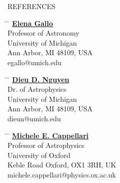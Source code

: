 \documentclass{resume} %
\begin{document}
\begin{rSection}{REFERENCES}
\noindent\parbox{0.1\textwidth}{ %
\begin{tabbing}
\hspace{0.2cm} \= \hspace{0.2cm} \= \kill %
\href{https://lsa.umich.edu/astro/people/core-faculty/egallo.html}{\textbf{Elena Gallo}}\\
Professor of Astronomy\\
University of Michigan\\
Ann Arbor, MI 48109, USA\\
egallo@umich.edu
\end{tabbing}}
\hfill %
\parbox{0.1\textwidth}{ %
\begin{tabbing}
\hspace{0.2cm} \= \hspace{0.2cm} \= \kill %
\href{https://scholar.google.com/citations?user=Koy8FSEAAAAJ&hl=vi&oi=ao}{\textbf{Dieu D. Nguyen}}\\
Dr. of Astrophysics\\
University of Michigan\\
Ann Arbor, MI 48109, USA\\ 
dieun@umich.edu
\end{tabbing}}
\hfill %
\parbox{0.1\textwidth}{ %
\begin{tabbing}
\hspace{0.2cm} \= \hspace{0.2cm} \= \kill %
\href{https://users.physics.ox.ac.uk/~cappellari/}{\textbf{Michele E. Cappellari}}\\
Professor of Astrophysics\\
University of Oxford\\
Keble Road Oxford, OX1 3RH, UK\\ 
michele.cappellari@physics.ox.ac.uk
\end{tabbing}}

\end{rSection}
\end{document}
